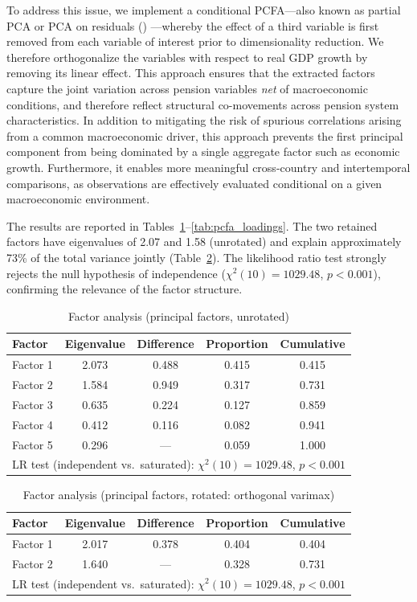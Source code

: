 \documentclass[11pt,english,a4paper, twoside, authoryear]{article}
\begin{document}
To address this issue, we implement a conditional PCFA---also known as partial PCA or PCA on residuals (\citealp{Boone2020}) ---whereby the effect of a third variable is first removed from each variable of interest prior to dimensionality reduction. We therefore orthogonalize the variables with respect to real GDP growth by removing its linear effect. This approach ensures that the extracted factors capture the joint variation across pension variables \emph{net} of macroeconomic conditions, and therefore reflect structural co-movements across pension system characteristics. In addition to mitigating the risk of spurious correlations arising from a common macroeconomic driver, this approach prevents the first principal component from being dominated by a single aggregate factor such as economic growth. Furthermore, it enables more meaningful cross-country and intertemporal comparisons, as observations are effectively evaluated conditional on a given macroeconomic environment.

The results are reported in Tables~\ref{tab:pcfa_unrot}--\ref{tab:pcfa_loadings}. The two retained factors have eigenvalues of 2.07 and 1.58 (unrotated) and explain approximately 73\% of the total variance jointly (Table~\ref{tab:pcfa_rot}). The likelihood ratio test strongly rejects the null hypothesis of independence ($\chi^2(10) = 1029.48$, $p < 0.001$), confirming the relevance of the factor structure.

\begin{table}[h!]
\centering
\caption{Factor analysis (principal factors, unrotated)}
\label{tab:pcfa_unrot}
\begin{tabular}{lcccc}
\hline\hline
Factor & Eigenvalue & Difference & Proportion & Cumulative \\
\hline
Factor 1 & 2.073 & 0.488 & 0.415 & 0.415 \\
Factor 2 & 1.584 & 0.949 & 0.317 & 0.731 \\
Factor 3 & 0.635 & 0.224 & 0.127 & 0.859 \\
Factor 4 & 0.412 & 0.116 & 0.082 & 0.941 \\
Factor 5 & 0.296 & ---   & 0.059 & 1.000 \\
\hline
\multicolumn{5}{l}{\scriptsize LR test (independent vs.\ saturated): $\chi^2(10) = 1029.48$, $p < 0.001$} \\
\hline\hline
\end{tabular}
\end{table}

\begin{table}[h!]
\centering
\caption{Factor analysis (principal factors, rotated: orthogonal varimax)}
\label{tab:pcfa_rot}
\begin{tabular}{lcccc}
\hline\hline
Factor & Eigenvalue & Difference & Proportion & Cumulative \\
\hline
Factor 1 & 2.017 & 0.378 & 0.404 & 0.404 \\
Factor 2 & 1.640 & ---   & 0.328 & 0.731 \\
\hline
\multicolumn{5}{l}{\scriptsize LR test (independent vs.\ saturated): $\chi^2(10) = 1029.48$, $p < 0.001$} \\
\hline\hline
\end{tabular}
\end{table}
\end{document}
